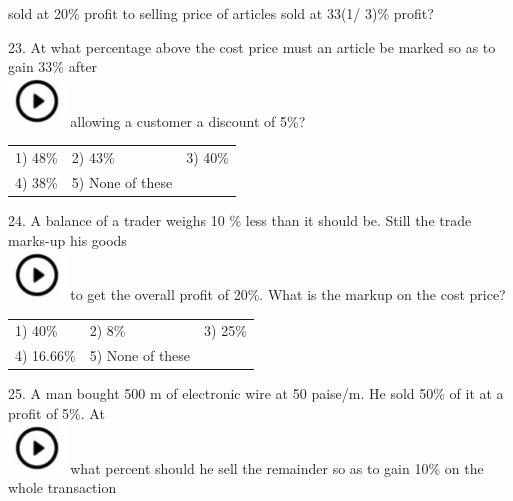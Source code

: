 \documentclass{article} %
\begin{document}
\noindent sold at 20\% profit to selling price of articles sold at 33(1/ 3)\% profit?

\noindent 

\noindent 

\noindent 

23. At what percentage above the cost price must an article be marked so as to gain 33\% after  
\noindent \\ \includegraphics*[width=0.60in, height=0.52in]{images/image1} allowing a customer a discount of 5\%?

\noindent 
\begin{tabular}{p{1.7in} p{1.6in} p{1.6in}} \\ 
	1) 48\%                    &  2) 43\%              &  3) 40\%              \\
4) 38\%              & 5) None of these  \\
\end{tabular}

24. A balance of a trader weighs 10 \% less than it should be. Still the trade marks-up his goods  
\noindent \\ \includegraphics*[width=0.60in, height=0.52in]{images/image1} to get the overall profit of 20\%. What is the markup on the cost price?

\noindent 
\begin{tabular}{p{1.7in} p{1.6in} p{1.6in}} \\ 
	1) 40\%                    &  2) 8\%                &  3) 25\%              \\
4) 16.66\%         & 5) None of these  \\
\end{tabular}

\noindent 

\noindent 

25. A man bought 500 m of electronic wire at 50 paise/m. He sold 50\% of it at a profit of 5\%. At  
\noindent \\ \includegraphics*[width=0.60in, height=0.52in]{images/image1} what percent should he sell the remainder so as to gain 10\% on the whole transaction
\end{document}

